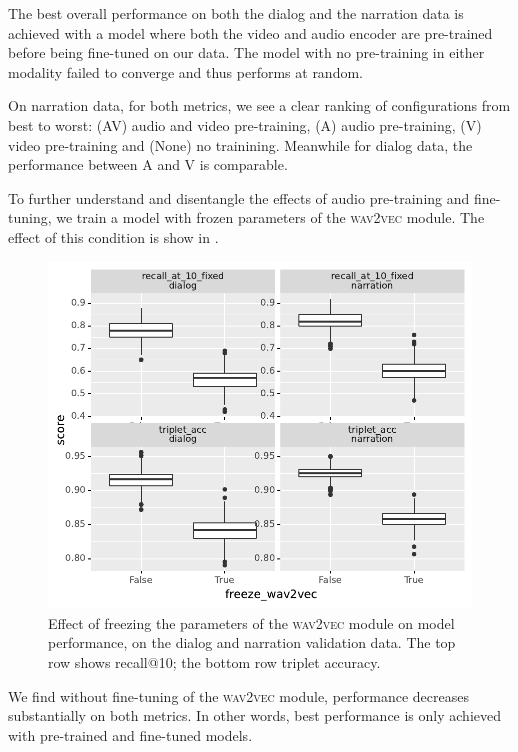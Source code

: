 The best overall performance on both the dialog and the narration data is 
achieved with a model where both the video and audio encoder are pre-trained 
before being fine-tuned on our data. The model with no pre-training in
either modality failed to converge and thus performs at random.


On narration data, for both metrics, we see a clear ranking of
configurations from best to worst: (AV) audio and video pre-training,
(A) audio pre-training, (V) video pre-training and (None) no
trainining. Meanwhile for dialog data, the performance between A and V
is comparable.


To further understand and disentangle the effects of audio pre-training and 
fine-tuning, we train a model with frozen parameters of the 
\textsc{wav2vec} module. The effect of this condition is show in .
\begin{figure}[htb]
  \centering
  \includegraphics[width=\columnwidth]{results/ablations/freeze_wav2vec.pdf}
  \caption{Effect of freezing the parameters of the \textsc{wav2vec}
    module on model performance, on the dialog and narration
    validation data. The top row shows recall@10; the bottom row
    triplet accuracy.}
  \label{fig:freeze_wav2vec}
\end{figure}
We find without fine-tuning of the \textsc{wav2vec} module, performance decreases substantially 
on both metrics. In other words, best performance is only achieved with pre-trained and 
fine-tuned models.



